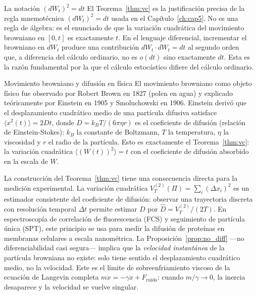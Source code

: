 \begin{observacion}{La notación $(dW_t)^2 = dt$}
El Teorema~\ref{thm:vc} es la justificación precisa de la regla mnemotécnica
$(dW_t)^2 = dt$ usada en el Capítulo~\ref{ch:cap5}. No es una regla de álgebra: es el
enunciado de que la variación cuadrática del movimiento browniano en $[0,t]$
es exactamente $t$. En el lenguaje diferencial, incrementar el browniano en
$dW_t$ produce una contribución $dW_t \cdot dW_t = dt$ al segundo orden que,
a diferencia del cálculo ordinario, no es $o(dt)$ sino exactamente $dt$.
Esta es la razón fundamental por la que el cálculo estocástico difiere del
cálculo ordinario.
\end{observacion}

\begin{fisicaconexion}{Movimiento browniano y difusión en física}
El movimiento browniano como objeto físico fue observado por Robert Brown en
1827 (polen en agua) y explicado teóricamente por Einstein en 1905 y Smoluchowski
en 1906. Einstein derivó que el desplazamiento cuadrático medio de una partícula
difusiva satisface $\langle x^2(t)\rangle = 2Dt$, donde $D = k_BT/(6\pi\eta r)$
es el coeficiente de difusión (relación de Einstein-Stokes): $k_B$ la constante
de Boltzmann, $T$ la temperatura, $\eta$ la viscosidad y $r$ el radio de la
partícula. Esto es exactamente el Teorema~\ref{thm:vc}: la variación cuadrática
$\langle(W(t))^2\rangle = t$ con el coeficiente de difusión absorbido en la
escala de $W$.

La construcción del Teorema~\ref{thm:vc} tiene una consecuencia directa para
la medición experimental. La variación cuadrática $V_T^{(2)}(\Pi) = \sum_i(\Delta
x_i)^2$ es un estimador consistente del coeficiente de difusión: observar una
trayectoria discreta con resolución temporal $\Delta t$ permite estimar $D$
por $\hat{D} = V_T^{(2)}/(2T)$. En espectroscopía de correlación de fluorescencia
(FCS) y seguimiento de partícula única (SPT), este principio se usa para medir
la difusión de proteínas en membranas celulares a escala nanométrica. La
Proposición~\ref{prop:no_diff} —no diferenciabilidad casi segura— implica que
la \emph{velocidad instantánea} de la partícula browniana no existe: solo
tiene sentido el desplazamiento cuadrático medio, no la velocidad. Este es el
límite de sobreenfriamiento viscoso de la ecuación de Langevin completa
$m\ddot{x} = -\gamma\dot{x} + F_{\mathrm{ruido}}$: cuando $m/\gamma \to 0$,
la inercia desaparece y la velocidad se vuelve singular.
\end{fisicaconexion}
\label{subsec:martingala}

